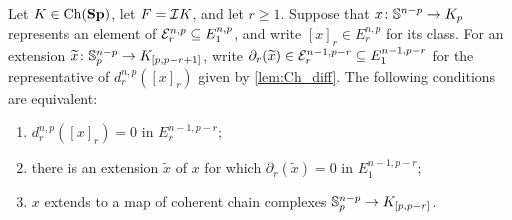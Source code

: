 \begin{lem}\label{lem:zero_dr_extension}
    Let $K \in \operatorname{Ch}(\mathbf{Sp})$, let $F=\mathcal{I} K$, and let $r\geq 1$. Suppose that
    $x\colon \mathbb{S}^{n-p}\to K_p$ represents an element of
    $\mathcal{E}_r^{n,p}\subseteq E_1^{n,p}$, and write $[x]_r\in E_r^{n,p}$ for
    its class. For an extension
    $\widetilde x\colon \mathbb{S}^{n-p}_p\to K_{[p,p-r+1]}$, write
    $\partial_r(\widetilde x)\in\mathcal{E}_r^{n-1,p-r}\subseteq E_1^{n-1,p-r}$
    for the representative of $d_r^{n,p}([x]_r)$ given by
    \cref{lem:Ch_diff}. The following
    conditions are equivalent:
    \begin{enumerate}
        \item $d_r^{n,p}([x]_r)=0$ in $E_r^{n-1,p-r}$;
        \item there is an extension $\widetilde x$ of $x$ for which
              $\partial_r(\widetilde x)=0$ in $E_1^{n-1,p-r}$;
        \item $x$ extends to a map of coherent chain complexes
              $\mathbb{S}^{n-p}_p\to K_{[p,p-r]}$.
    \end{enumerate}
\end{lem}
